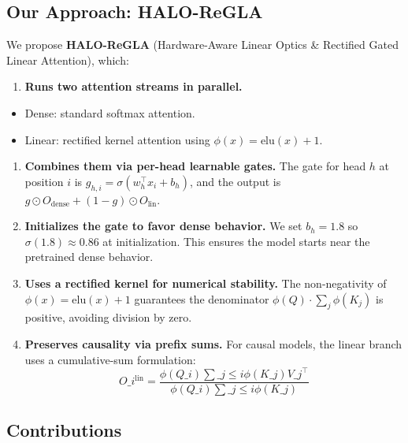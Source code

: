 \subsection{Our Approach: HALO-ReGLA}

We propose \textbf{HALO-ReGLA} (Hardware-Aware Linear Optics \& Rectified Gated 
Linear Attention), which:

\begin{enumerate}
\item \textbf{Runs two attention streams in parallel.}
\end{enumerate}
\begin{itemize}
\item Dense: standard softmax attention.
\item Linear: rectified kernel attention using $\phi(x) = \mathrm{elu}(x) + 1$.

\end{itemize}
\begin{enumerate}
\item \textbf{Combines them via per-head learnable gates.} The gate for head $h$ at
  position $i$ is $g_{h,i} = \sigma(w_h^\top x_i + b_h)$, and the output is
  $g \odot O_\text{dense} + (1 - g) \odot O_\text{lin}$.

\item \textbf{Initializes the gate to favor dense behavior.} We set $b_h = 1.8$ so
  $\sigma(1.8) \approx 0.86$ at initialization. This ensures the model
  starts near the pretrained dense behavior.

\item \textbf{Uses a rectified kernel for numerical stability.} The non-negativity of
  $\phi(x) = \mathrm{elu}(x) + 1$ guarantees the denominator
  $\phi(Q) \cdot \sum_j \phi(K_j)$ is positive, avoiding division by zero.

\item \textbf{Preserves causality via prefix sums.} For causal models, the linear
  branch uses a cumulative-sum formulation:
  $$
  O\_i^\text{lin} = \frac{\phi(Q\_i) \sum\_{j \le i} \phi(K\_j) V\_j^\top}{\phi(Q\_i) \sum\_{j \le i} \phi(K\_j)}
  $$

\end{enumerate}
\subsection{Contributions}

